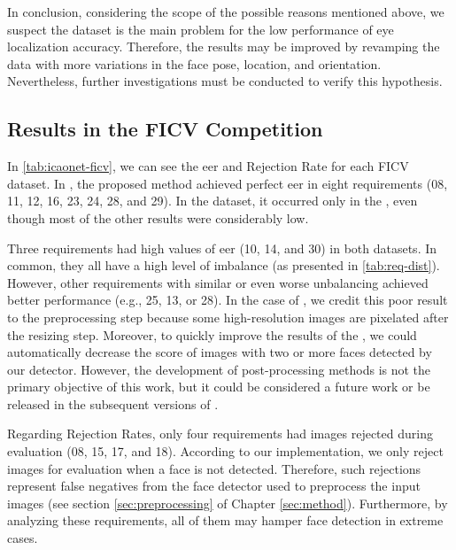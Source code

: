 In conclusion, considering the scope of the possible reasons mentioned above, we suspect the dataset is the main problem for the low performance of eye localization accuracy. Therefore, the results may be improved by revamping the data with more variations in the face pose, location, and orientation. Nevertheless, further investigations must be conducted to verify this hypothesis.
 
 
\subsection{Results in the FICV Competition} \label{sec:ficv_results}
 
In \autoref{tab:icaonet-ficv}, we can see the \acl{eer} and Rejection Rate for each FICV dataset. In \ficvtest, the proposed method achieved perfect \acs{eer} in eight requirements (08, 11, 12, 16, 23, 24, 28, and 29). In the \ficvofficial dataset, it occurred only in the \veiloverface, even though most of the other results were considerably low. 
 

 
Three requirements had high values of \acs{eer} (10, 14, and 30) in both datasets. In common, they all have a high level of imbalance (as presented in \autoref{tab:req-dist}). However, other requirements with similar or even worse unbalancing achieved better performance (e.g., 25, 13, or 28). In the case of \pixelation, we credit this poor result to the preprocessing step because some high-resolution images are pixelated after the resizing step. Moreover, to quickly improve the results of the \otherfacesortoys, we could automatically decrease the score of images with two or more faces detected by our detector. However, the development of post-processing methods is not the primary objective of this work, but it could be considered a future work or be released in the subsequent versions of \methodname.
 
Regarding Rejection Rates, only four requirements had images rejected during evaluation (08, 15, 17, and 18). According to our implementation, we only reject images for evaluation when a face is not detected. Therefore, such rejections represent false negatives from the face detector used to preprocess the input images (see section \ref{sec:preprocessing} of Chapter \ref{sec:method}). Furthermore, by analyzing these requirements, all of them may hamper face detection in extreme cases. 
 
